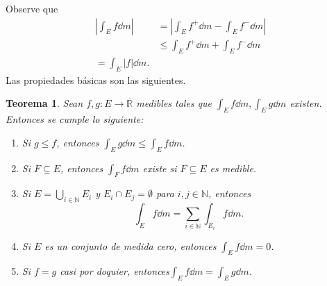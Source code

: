 \documentclass[12pt]{article}
\theoremstyle{plain}
\newtheorem{Th}{Teorema}[subsection]   %
\theoremstyle{definition}
\theoremstyle{remark}
\numberwithin{equation}{section}
\newcommand{\bN}{\mathbb{N}}        %
\newcommand{\bR}{\mathbb{R}}        %
\renewcommand{\leq}{\leqslant}      %
\renewcommand{\:}{\colon}           %
\begin{document}
\begin{multicols}{2}
Observe que
\begin{align*}
  \left|\int_Ef\dd m\right| &=  \left|\int_Ef^+\dd m-\int_Ef^-\dd m\right|\\
   &\leq \int_Ef^+\dd m+\int_Ef^-\dd m\\
   =\int_E|f|\dd m.
\end{align*}
Las propiedades básicas son las siguientes.
\begin{Th}
  Sean $f,g\:E\to\overline{\bR}$ medibles tales que $\int_Ef\dd m,\int_Eg\dd m$ existen. Entonces se cumple lo siguiente:
  \begin{enumerate}
    \item Si $g\leq f$, entonces $\int_Eg\dd m\leq\int_Ef\dd m$.
    \item Si $F\subseteq E$, entonces $\int_Ff\dd m$ existe si $F\subseteq E$ es medible.
    \item Si $E=\bigcup_{i\in\bN}E_i$ y $E_i\cap E_j=\emptyset$ para $i,j\in\bN$, entonces
    $$\int_Ef\dd m=\sum_{i\in\bN}\int_{E_i}f\dd m.$$
    \item Si $E$ es un conjunto de medida cero, entonces $\int_Ef\dd m =0$.
    \item Si $f=g$ casi por doquier, entonces$\int_Ef\dd m =\int_Eg\dd m$.
  \end{enumerate}
\end{Th}


\end{multicols}
\end{document}
